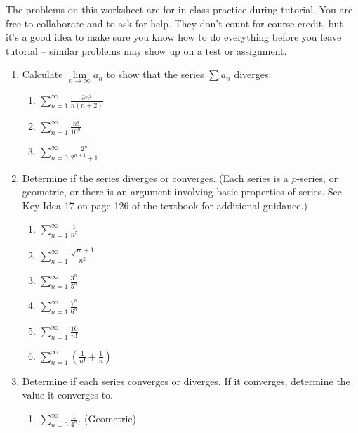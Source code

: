 \documentclass[12pt]{article}
\newcommand{\di}{\displaystyle}
\begin{document}
\thispagestyle{fancy}
The problems on this worksheet are for in-class practice during tutorial. You are free to collaborate and to ask for help. They don't count for course credit, but it's a good idea to make sure you know how to do everything before you leave tutorial -- similar problems may show up on a test or assignment.

\begin{enumerate}
 \item Calculate $\lim\limits_{n\to\infty}a_n$ to show that the series $\sum a_n$ diverges:
\begin{multicols}{3}
\begin{enumerate}
 \item $\di \sum_{n=1}^\infty \frac{3n^2}{n(n+2)}$
 \item $\di \sum_{n=1}^\infty \frac{n!}{10^n}$
 \item $\di \sum_{n=0}^\infty \frac{2^n}{2^{n+1}+1}$
\end{enumerate}
\end{multicols}
 \item Determine if the series diverges or converges. (Each series is a $p$-series, or geometric, or there is an argument involving basic properties of series. See Key Idea 17 on page 126 of the textbook for additional guidance.)
\begin{multicols}{3}
\begin{enumerate}
 \item $\di \sum_{n=1}^\infty\frac{1}{n^5}$
 \item $\di \sum_{n=1}^\infty \frac{\sqrt{n}+1}{n^2}$
 \item $\di \sum_{n=1}^\infty \frac{3^n}{5^n}$
 \item $\di \sum_{n=1}^\infty \frac{7^n}{6^n}$
 \item $\di \sum_{n=1}^\infty \frac{10}{n!}$
 \item $\di \sum_{n=1}^\infty\left(\frac{1}{n!}+\frac{1}{n}\right)$
\end{enumerate}
\end{multicols}
 \item Determine if each series converges or diverges. If it converges, determine the value it converges to.
\begin{multicols}{2}
\begin{enumerate}
 \item $\di \sum_{n=0}^\infty \frac{1}{4^n}$. (Geometric)

\end{enumerate}
\end{multicols}
\end{enumerate}
\end{document}
